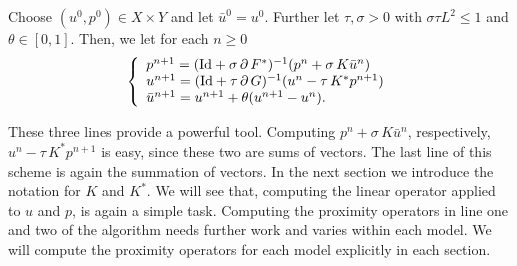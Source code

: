     \begin{algorithm}
    \label{alg:fast_primal_dual_algorithm}
        Choose $(u^{0}, p^{0}) \in X \times Y$ and let $\bar{u}^{0} = u^{0}$. Further let $\tau, \sigma > 0$ with $\sigma\tau L^{2} \le 1$ and $\theta \in [0, 1]$. Then, we let for each $n \ge 0$
            \begin{equation}
                \left\{ 
                    \begin{array}{l l}
                        p^{n+1} = (\textnormal{Id} + \sigma\,\partial\,F^{\ast})^{-1}(p^{n} + \sigma\,K\bar{u}^{n}) \\
                        u^{n+1} = (\textnormal{Id} + \tau\,\partial\,G)^{-1}(u^{n} - \tau\,K^{\ast}p^{n+1}) \\
                        \bar{u}^{n+1} = u^{n+1} + \theta (u^{n+1} - u^{n}).
                    \end{array}
                \right.
            \label{eq:fast_primal_dual_algorithm}
            \end{equation}
    \end{algorithm}

    These three lines provide a powerful tool. Computing $p^{n} + \sigma\,K\bar{u}^{n}$, respectively, $u^{n} - \tau\,K^{\ast}p^{n+1}$ is easy, since these two are sums of vectors. The last line of this scheme is again the summation of vectors. In the next section we introduce the notation for $K$ and $K^{\ast}$. We will see that, computing the linear operator applied to $u$ and $p$, is again a simple task. Computing the proximity operators in line one and two of the algorithm needs further work and varies within each model. We will compute the proximity operators for each model explicitly in each section.

